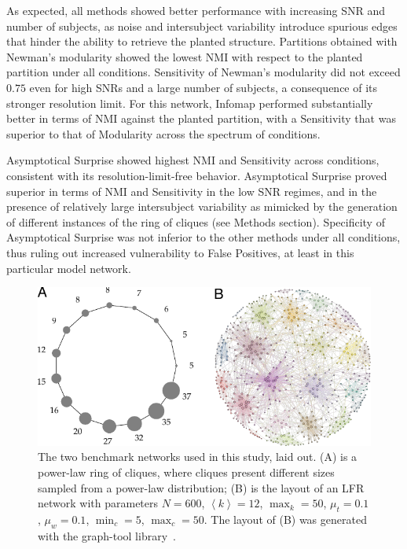 As expected, all methods showed better performance with increasing SNR and number of subjects, as noise and intersubject variability introduce spurious edges that hinder the ability to retrieve the planted structure.
Partitions obtained with Newman's modularity showed the lowest NMI with respect to the planted partition under all conditions.
Sensitivity of Newman's modularity did not exceed $0.75$ even for high SNRs and a large number of subjects, a consequence of its stronger resolution limit.
For this network, Infomap performed substantially better in terms of NMI against the planted partition, with a Sensitivity that was superior to that of Modularity across the spectrum of conditions.

Asymptotical Surprise showed highest NMI and Sensitivity across conditions, consistent with its resolution-limit-free behavior.
Asymptotical Surprise proved superior in terms of NMI and Sensitivity in the low SNR regimes, and in the presence of relatively large intersubject variability as mimicked by the generation of different instances of the ring of cliques (see Methods section).
Specificity of Asymptotical Surprise was not inferior to the other methods under all conditions, thus ruling out increased vulnerability to False Positives, at least in this particular model network.

\begin{figure}[htb!]
\includegraphics[width=1\textwidth]{images/pacopaperfigure1.pdf}
\caption{The two benchmark networks used in this study, laid out. (A) is a power-law ring of cliques, where cliques present different sizes sampled from a power-law distribution;
(B) is the layout of an LFR network with parameters $N=600$, $\left< k \right>=12$, $\max_k=50$, $\mu_t=0.1$, $\mu_w=0.1$, $\min_c=5$, $\max_c=50$.
The layout of (B) was generated with the graph-tool library~\cite{peixoto_graph_tool_2014}.}
\label{fig:lfrringclique}
\end{figure}

